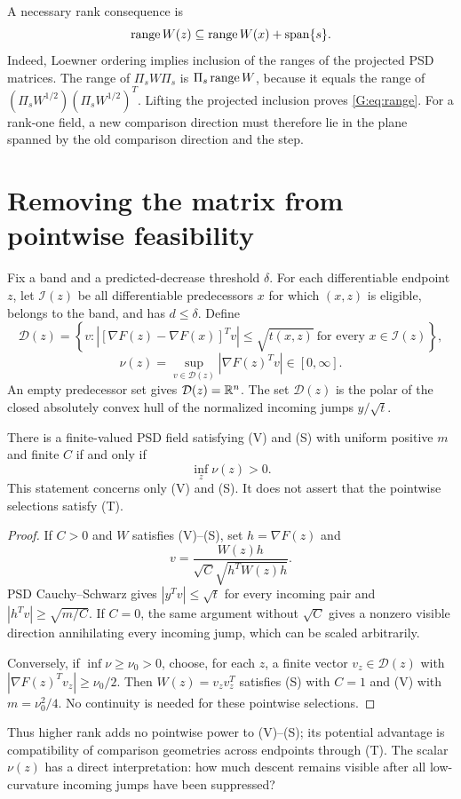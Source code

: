 A necessary rank consequence is
\begin{equation}
 \operatorname{range} W(z)\subseteq\operatorname{range} W(x)+\operatorname{span}\{s\}. \label{G:eq:range}
\end{equation}
Indeed, Loewner ordering implies inclusion of the ranges of the projected PSD matrices. The range of $\Pi_sW\Pi_s$ is $\Pi_s\operatorname{range} W$, because it equals the range of $(\Pi_sW^{1/2})(\Pi_sW^{1/2})^T$. Lifting the projected inclusion proves \eqref{G:eq:range}. For a rank-one field, a new comparison direction must therefore lie in the plane spanned by the old comparison direction and the step.


\setcounter{section}{2}
\setcounter{theorem}{0}
\setcounter{equation}{3}


\section{Removing the matrix from pointwise feasibility}

Fix a band and a predicted-decrease threshold $\delta$. For each differentiable endpoint $z$, let $\mathcal I(z)$ be all differentiable predecessors $x$ for which $(x,z)$ is eligible, belongs to the band, and has $d\le\delta$. Define
\[
 \mathcal D(z)=\left\{v:\left|[\nabla F(z)-\nabla F(x)]^Tv\right|
       \le\sqrt{t(x,z)}\ \text{for every }x\in\mathcal I(z)\right\},
\]
\begin{equation}
 \nu(z)=\sup_{v\in\mathcal D(z)}|\nabla F(z)^Tv|\in[0,\infty]. \label{G:eq:nu}
\end{equation}
An empty predecessor set gives $\mathcal D(z)=\mathbb R^n$. The set $\mathcal D(z)$ is the polar of the closed absolutely convex hull of the normalized incoming jumps $y/\sqrt t$.

\begin{proposition}
There is a finite-valued PSD field satisfying (V) and (S) with uniform positive $m$ and finite $C$ if and only if
\[
 \inf_z\nu(z)>0.
\]
This statement concerns only (V) and (S). It does not assert that the pointwise selections satisfy (T).
\end{proposition}
\begin{proof}
If $C>0$ and $W$ satisfies (V)--(S), set $h=\nabla F(z)$ and
\[
 v=\frac{W(z)h}{\sqrt C\sqrt{h^TW(z)h}}.
\]
PSD Cauchy--Schwarz gives $|y^Tv|\le\sqrt t$ for every incoming pair and
$|h^Tv|\ge\sqrt{m/C}$. If $C=0$, the same argument without $\sqrt C$ gives a nonzero visible direction annihilating every incoming jump, which can be scaled arbitrarily.

Conversely, if $\inf\nu\ge\nu_0>0$, choose, for each $z$, a finite vector $v_z\in\mathcal D(z)$ with $|\nabla F(z)^Tv_z|\ge\nu_0/2$. Then $W(z)=v_zv_z^T$ satisfies (S) with $C=1$ and (V) with $m=\nu_0^2/4$. No continuity is needed for these pointwise selections.
\end{proof}
Thus higher rank adds no pointwise power to (V)--(S); its potential advantage is compatibility of comparison geometries across endpoints through (T). The scalar $\nu(z)$ has a direct interpretation: how much descent remains visible after all low-curvature incoming jumps have been suppressed?

